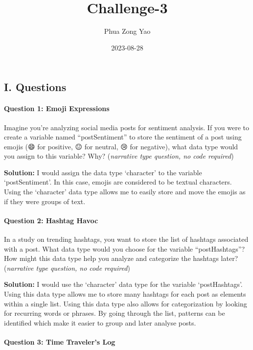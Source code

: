 \documentclass[
]{article}
\title{Challenge-3}
\author{Phua Zong Yao}
\date{2023-08-28}
\begin{document}
\maketitle

\hypertarget{i.-questions}{%
\subsection{I. Questions}\label{i.-questions}}

\hypertarget{question-1-emoji-expressions}{%
\paragraph{Question 1: Emoji
Expressions}\label{question-1-emoji-expressions}}

Imagine you're analyzing social media posts for sentiment analysis. If
you were to create a variable named ``postSentiment'' to store the
sentiment of a post using emojis (😄 for positive, 😐 for neutral, 😢
for negative), what data type would you assign to this variable? Why?
(\emph{narrative type question, no code required})

\textbf{Solution:} I would assign the data type `character' to the
variable `postSentiment'. In this case, emojis are considered to be
textual characters. Using the `character' data type allows me to easily
store and move the emojis as if they were groups of text.

\hypertarget{question-2-hashtag-havoc}{%
\paragraph{Question 2: Hashtag Havoc}\label{question-2-hashtag-havoc}}

In a study on trending hashtags, you want to store the list of hashtags
associated with a post. What data type would you choose for the variable
``postHashtags''? How might this data type help you analyze and
categorize the hashtags later? (\emph{narrative type question, no code
required})

\textbf{Solution:} I would use the `character' data type for the
variable `postHashtags'. Using this data type allows me to store many
hashtags for each post as elements within a single list. Using this data
type also allows for categorization by looking for recurring words or
phrases. By going through the list, patterns can be identified which
make it easier to group and later analyse posts.

\hypertarget{question-3-time-travelers-log}{%
\paragraph{Question 3: Time Traveler's
Log}\label{question-3-time-travelers-log}}
\end{document}
